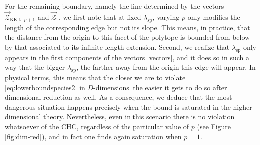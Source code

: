 For the remaining boundary, namely the line determined by the vectors $\vec{\mathcal{Z}}_{\text{KK-t},\, p+1}$ and $\vec{\mathcal{Z}}_{\text{t}}$, we first note that at fixed $\lambda_{\text{sp}}$, varying $p$ only modifies the length of the corresponding edge but not its slope. This means, in practice, that the distance from the origin to this facet of the polytope is bounded from below by that associated to its infinite length extension. Second, we realize that $\lambda_{\text{sp}}$ only appears in the first components of the vectors \eqref{vectors}, and it does so in such a way that the bigger $\lambda_{\text{sp}}$, the farther away from the origin this edge will appear. In physical terms, this means that the closer we are to violate \eqref{eq:lowerboundspecies2} in $D$-dimensions, the easier it gets to do so after dimensional reduction as well. As a consequence, we deduce that the most dangerous situation happens precisely when the bound is saturated in the higher-dimensional theory. Nevertheless, even in this scenario there is no violation whatsoever of the CHC, regardless of the particular value of $p$ (see Figure \ref{fig:dim-red}), and in fact one finds again saturation when $p=1$. %


